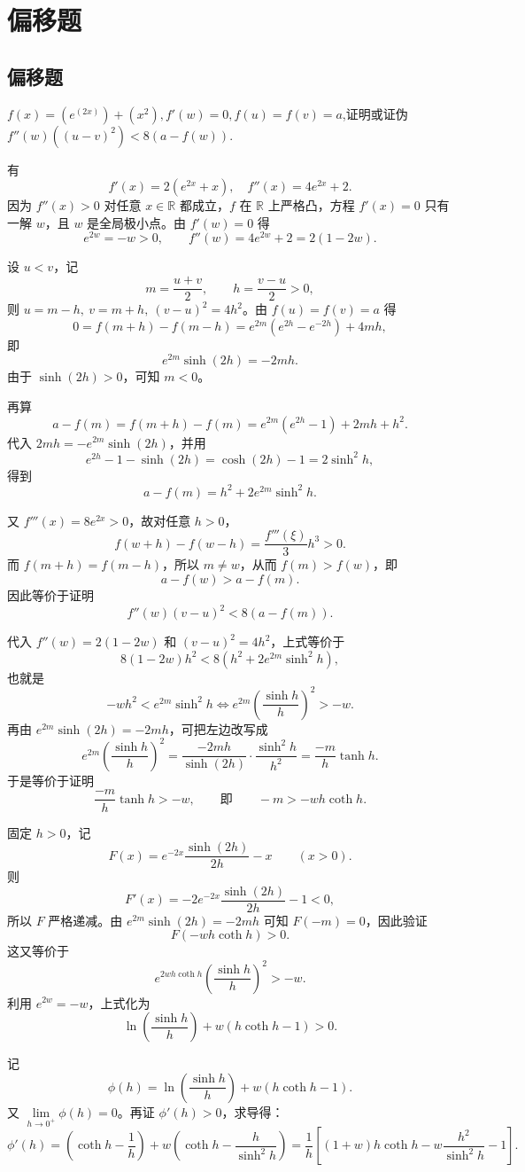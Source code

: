 \chapter{偏移题}
\section{偏移题}
\begin{example}
$f(x)=(e^(2x))+(x^2),f'(w)=0,f(u)=f(v)=a$,证明或证伪$f''(w)((u-v)^2)<8(a-f(w))$.
\end{example}
\begin{solution}
有
$$ f'(x) = 2(e^{2x} + x), \quad f''(x) = 4e^{2x} + 2. $$
因为 $f''(x)>0$ 对任意 $x\in\mathbb R$ 都成立，$f$ 在 $\mathbb R$ 上严格凸，方程 $f'(x)=0$ 只有一解 $w$，且 $w$ 是全局极小点。由 $f'(w)=0$ 得
$$ e^{2w}=-w>0,\qquad f''(w)=4e^{2w}+2=2(1-2w). $$

设 $u<v$，记
$$ m=\frac{u+v}{2},\qquad h=\frac{v-u}{2}>0, $$
则 $u=m-h,\ v=m+h,\ (v-u)^2=4h^2$。由 $f(u)=f(v)=a$ 得
$$ 0=f(m+h)-f(m-h)=e^{2m}(e^{2h}-e^{-2h})+4mh, $$
即
$$ e^{2m}\sinh(2h)=-2mh. $$
由于 $\sinh(2h)>0$，可知 $m<0$。

再算
$$ a-f(m)=f(m+h)-f(m)=e^{2m}(e^{2h}-1)+2mh+h^2. $$
代入 $2mh=-e^{2m}\sinh(2h)$，并用
$$ e^{2h}-1-\sinh(2h)=\cosh(2h)-1=2\sinh^2 h, $$
得到
$$ a-f(m)=h^2+2e^{2m}\sinh^2 h. $$

又 $f'''(x)=8e^{2x}>0$，故对任意 $h>0$，
$$ f(w+h)-f(w-h)=\frac{f'''(\xi)}{3}h^3>0. $$
而 $f(m+h)=f(m-h)$，所以 $m\ne w$，从而 $f(m)>f(w)$，即
$$ a-f(w)>a-f(m). $$
因此等价于证明
$$ f''(w)(v-u)^2<8(a-f(m)). $$

代入 $f''(w)=2(1-2w)$ 和 $(v-u)^2=4h^2$，上式等价于
$$ 8(1-2w)h^2<8(h^2+2e^{2m}\sinh^2 h), $$
也就是
$$ -wh^2<e^{2m}\sinh^2 h \iff e^{2m}\left(\frac{\sinh h}{h}\right)^2>-w. $$
再由 $e^{2m}\sinh(2h)=-2mh$，可把左边改写成
$$ e^{2m}\left(\frac{\sinh h}{h}\right)^2
=\frac{-2mh}{\sinh(2h)}\cdot\frac{\sinh^2 h}{h^2}
=\frac{-m}{h}\tanh h. $$
于是等价于证明
$$ \frac{-m}{h}\tanh h>-w, \qquad\text{即}\qquad -m>-wh\coth h. $$

固定 $h>0$，记
$$ F(x)=e^{-2x}\frac{\sinh(2h)}{2h}-x \qquad (x>0). $$
则
$$ F'(x)=-2e^{-2x}\frac{\sinh(2h)}{2h}-1<0, $$
所以 $F$ 严格递减。由 $e^{2m}\sinh(2h)=-2mh$ 可知 $F(-m)=0$，因此验证
$$ F(-wh\coth h)>0. $$
这又等价于
$$ e^{2wh\coth h}\left(\frac{\sinh h}{h}\right)^2>-w. $$
利用 $e^{2w}=-w$，上式化为
$$ \ln\left(\frac{\sinh h}{h}\right)+w(h\coth h-1)>0. $$

记
$$ \phi(h)=\ln\left(\frac{\sinh h}{h}\right)+w(h\coth h-1). $$
又 $\lim\limits_{h\to0^+}\phi(h)=0$。再证 $\phi'(h)>0$，求导得：
$$ \phi'(h)=\left(\coth h-\frac1h\right)+w\left(\coth h-\frac{h}{\sinh^2 h}\right)
=\frac1h\left[(1+w)h\coth h-w\frac{h^2}{\sinh^2 h}-1\right]. $$


\end{solution}
